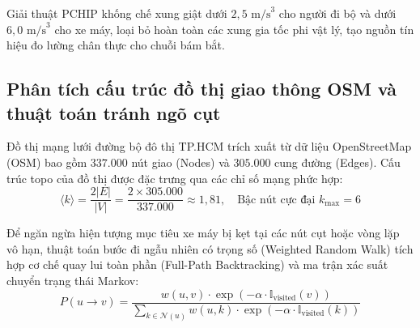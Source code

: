 Giải thuật PCHIP khống chế xung giật dưới $2{,}5\text{ m/s}^3$ cho người đi bộ và dưới $6{,}0\text{ m/s}^3$ cho xe máy, loại bỏ hoàn toàn các xung gia tốc phi vật lý, tạo nguồn tín hiệu đo lường chân thực cho chuỗi bám bắt.

\subsection{Phân tích cấu trúc đồ thị giao thông OSM và thuật toán tránh ngõ cụt}

\hspace{0.5cm} Đồ thị mạng lưới đường bộ đô thị TP.HCM trích xuất từ dữ liệu OpenStreetMap (OSM) bao gồm $337.000$ nút giao (Nodes) và $305.000$ cung đường (Edges). Cấu trúc topo của đồ thị được đặc trưng qua các chỉ số mạng phức hợp:
\begin{equation}
\langle k \rangle = \frac{2 |E|}{|V|} = \frac{2 \times 305.000}{337.000} \approx 1{,}81, \quad \text{Bậc nút cực đại } k_{\max} = 6
\label{eq:graph-average-degree-formula}
\end{equation}

Để ngăn ngừa hiện tượng mục tiêu xe máy bị kẹt tại các nút cụt hoặc vòng lặp vô hạn, thuật toán bước đi ngẫu nhiên có trọng số (Weighted Random Walk) tích hợp cơ chế quay lui toàn phần (Full-Path Backtracking) và ma trận xác suất chuyển trạng thái Markov:
\begin{equation}
P(u \to v) = \frac{w(u, v) \cdot \exp(-\alpha \cdot \mathbb{I}_{\text{visited}}(v))}{\sum_{k \in \mathcal{N}(u)} w(u, k) \cdot \exp(-\alpha \cdot \mathbb{I}_{\text{visited}}(k))}
\label{eq:markov-dead-end-avoidance}
\end{equation}

\begin{table}[H]
\centering
\caption{Đo đạc độ dài hành trình và tỷ lệ tránh kẹt ngõ cụt của giải thuật định tuyến xe máy}
\label{tab:dead-end-avoidance-metrics}
\end{table}

